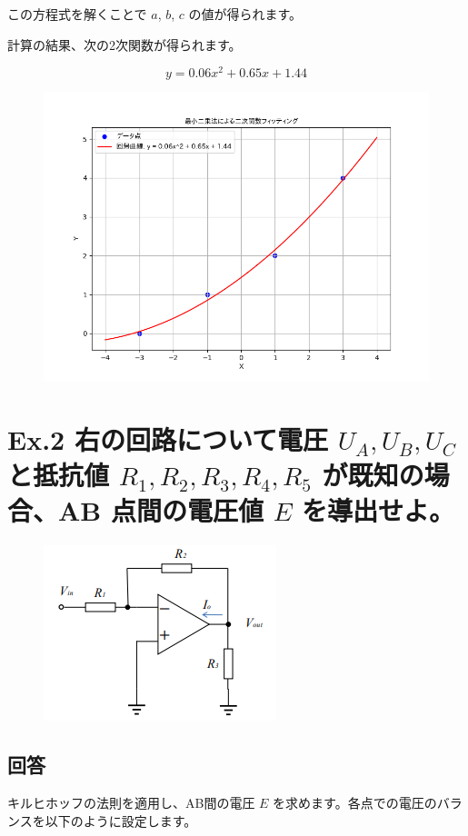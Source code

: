 \documentclass{article}
\begin{document}
この方程式を解くことで \(a\), \(b\), \(c\) の値が得られます。

計算の結果、次の2次関数が得られます。

\[
y = 0.06x^2 + 0.65x + 1.44
\]

\begin{figure}[H]
    \centering
    \includegraphics[width=0.7\linewidth]{quadratic_fit.png}
\end{figure}

\newpage  %

\section*{Ex.2 右の回路について電圧 \(U_A, U_B, U_C\) と抵抗値 \(R_1, R_2, R_3, R_4, R_5\) が既知の場合、AB 点間の電圧値 \(E\) を導出せよ。}
\begin{figure}[H]
    \centering
    \includegraphics[width=0.7\linewidth]{e2.png}
\end{figure}

\subsection*{回答}
キルヒホッフの法則を適用し、AB間の電圧 \(E\) を求めます。各点での電圧のバランスを以下のように設定します。
\end{document}
